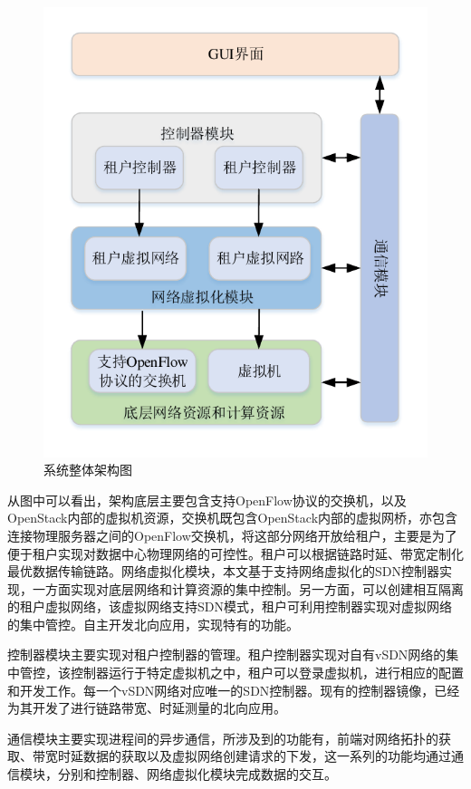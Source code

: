 \begin{figure}[!htb]
  \centering
  \includegraphics[scale=0.8]{logo/architecture-a}
  \caption{系统整体架构图}
  \label{fig:artic}
\end{figure}

从图中可以看出，架构底层主要包含支持OpenFlow协议的交换机，以及OpenStack内部的虚拟机资源，交换机既包含OpenStack内部的虚拟网桥，亦包含连接物理服务器之间的OpenFlow交换机，将这部分网络开放给租户，主要是为了便于租户实现对数据中心物理网络的可控性。租户可以根据链路时延、带宽定制化最优数据传输链路。网络虚拟化模块，本文基于支持网络虚拟化的SDN控制器实现，一方面实现对底层网络和计算资源的集中控制。另一方面，可以创建相互隔离的租户虚拟网络，该虚拟网络支持SDN模式，租户可利用控制器实现对虚拟网络的集中管控。自主开发北向应用，实现特有的功能。

控制器模块主要实现对租户控制器的管理。租户控制器实现对自有vSDN网络的集中管控，该控制器运行于特定虚拟机之中，租户可以登录虚拟机，进行相应的配置和开发工作。每一个vSDN网络对应唯一的SDN控制器。现有的控制器镜像，已经为其开发了进行链路带宽、时延测量的北向应用。

通信模块主要实现进程间的异步通信，所涉及到的功能有，前端对网络拓扑的获取、带宽时延数据的获取以及虚拟网络创建请求的下发，这一系列的功能均通过通信模块，分别和控制器、网络虚拟化模块完成数据的交互。

